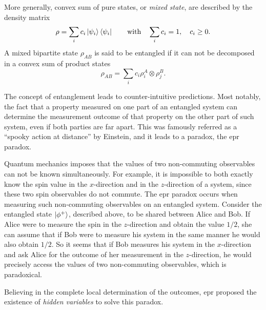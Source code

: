 More generally, convex sum of pure states, or \textit{mixed state}, are described by the density matrix
\begin{equation}
	\rho = \sum_i c_i \ket{\psi_i} \bra{\psi_i} \qquad \text{with} \quad \sum_i c_i = 1,\quad c_i\geq 0.
	\label{eq:mixed_state}
\end{equation}
A mixed bipartite state $\rho_{AB}$ is said to be entangled if it can not be decomposed in a convex sum of product states
\begin{equation}
	\rho_{AB} = \sum_i c_i \rho^A_i \otimes \rho^B_j.
	\label{eq:product_state}
\end{equation}

\medbreak

The concept of entanglement leads to counter-intuitive predictions. 
Most notably, the fact that a property measured on one part of an entangled system can determine the measurement outcome of that property on the other part of such system, even if both parties are far apart. 
This was famously referred as a \enquote{spooky action at distance} by Einstein, and it leads to a paradox, the \acrshort{epr} paradox.

Quantum mechanics imposes that the values of two non-commuting observables can not be known simultaneously. 
For example, it is impossible to both exactly know the spin value in the $x$-direction and in the $z$-direction of a system, since these two spin observables do not commute.
The \acrshort{epr} paradox occurs when measuring such non-commuting observables on an entangled system.
Consider the entangled state $\ket{\phi^+}$, described above, to be shared between Alice and Bob.
If Alice were to measure the spin in the $z$-direction and obtain the value $1/2$, she can assume that if Bob were to measure his system in the same manner he would also obtain $1/2$. 
So it seems that if Bob measures his system in the $x$-direction and ask Alice for the outcome of her measurement in the $z$-direction, he would precisely access the values of two non-commuting observables, which is paradoxical.

Believing in the complete local determination of the outcomes, \acrlong{epr} proposed the existence of \textit{hidden variables} to solve this paradox. 

